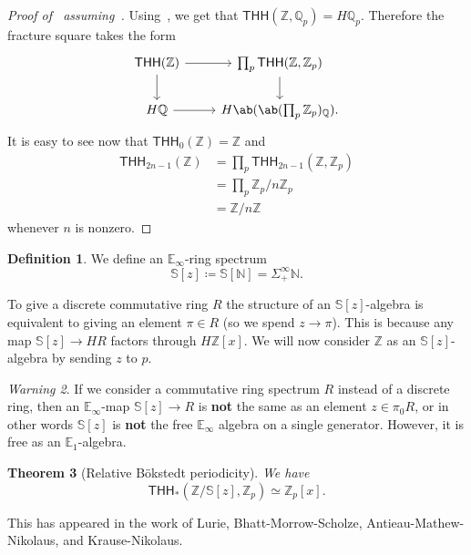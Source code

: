 \documentclass[10pt, oneside]{memoir}
\newtheorem{thm}{Theorem}[subsection]
\theoremstyle{definition}
\newtheorem{defn}[thm]{Definition}
\theoremstyle{remark}
\newtheorem{warn}[thm]{Warning}
\theoremstyle{plain}
\theoremstyle{definition}
\theoremstyle{remark}
\newcommand{\N}{\mathbb{N}}
\newcommand{\Z}{\mathbb{Z}}
\newcommand{\Q}{\mathbb{Q}}
\newcommand{\E}{\mathbb{E}}
\newcommand{\bS}{\mathbb{S}}
\newcommand{\ms}[1]{\mathsf{#1}}
\newcommand{\1}{\mathbf{1}}
\newcommand{\2}{\mathbf{2}}
\newcommand{\3}{\mathbf{3}}
\newcommand{\THH}{\ms{THH}}
\begin{document}
\begin{proof}[Proof of~ assuming~]
    Using~, we get that \(\THH(\Z, \Q_p) = H \Q_p \). Therefore the fracture square takes the form
    \begin{equation*}
    \begin{tikzcd}
        \THH(\Z) \ar{r} \ar{d} & \prod_{p} \THH(\Z, \Z_p) \ar{d} \\
        H\Q \ar{r} & H \ab(\ab(\prod_p \Z_p)_{\Q}).
    \end{tikzcd}
    \end{equation*}
    It is easy to see now that \(\THH_0(\Z) = \Z \) and 
    \begin{align*}
        \THH_{2n-1}(\Z) &= \prod_p \THH_{2n-1}(\Z, \Z_p) \\
        &= \prod_p \Z_p / n\Z_p \\
        &= \Z/n\Z
    \end{align*}
    whenever \(n \) is nonzero.
\end{proof}

\begin{defn}
    We define an \(\E_{\infty} \)-ring spectrum
    \[ \bS [ z] \coloneqq \bS[\N] = \Sigma_+^{\infty} \N. \]
\end{defn}

To give a discrete commutative ring \(R \) the structure of an \(\bS[z] \)-algebra is equivalent to giving an element \(\pi \in R \) (so we spend \(z \to \pi \)). This is because any map \(\bS[z] \to HR \) factors through \(H\Z[x] \). We will now consider \(\Z \) as an \(\bS[z] \)-algebra by sending \(z \) to \(p \).

\begin{warn}
    If we consider a commutative ring spectrum \(R \) instead of a discrete ring, then an \(\E_{\infty} \)-map \(\bS[z] \to R \) is \textbf{not} the same as an element \(z \in \pi_0 R \), or in other words \(\bS[z] \) is \textbf{not} the free \(\E_{\infty} \) algebra on a single generator. However, it is free as an \(\E_1 \)-algebra.
\end{warn}

\begin{thm}[Relative B\"okstedt periodicity]
    We have
    \[ \THH_*(\Z/\bS[z], \Z_p) \simeq \Z_p [ x]. \]
\end{thm}

This has appeared in the work of Lurie, Bhatt-Morrow-Scholze, Antieau-Mathew-Nikolaus, and Krause-Nikolaus.
\end{document}
